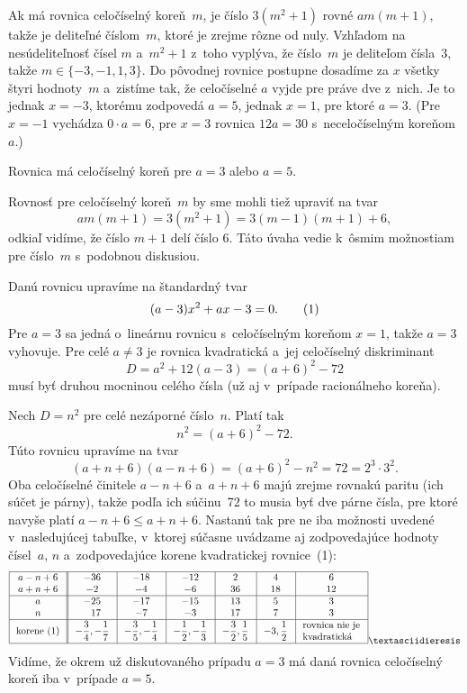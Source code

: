 {%
Ak má rovnica celočíselný koreň~$m$, je číslo $3(m^2+1)$
rovné $am(m+1)$, takže je deliteľné číslom~$m$, ktoré je zrejme
rôzne od nuly. Vzhľadom na nesúdeliteľnosť
čísel $m$ a~$m^2+1$ z~toho vyplýva, že číslo~$m$ je deliteľom čísla~$3$,
takže $m\in\{-3, -1, 1, 3\}$. Do pôvodnej rovnice postupne dosadíme
za $x$ všetky štyri hodnoty~$m$ a~zistíme tak, že celočíselné $a$ vyjde
pre práve dve z~nich. Je to jednak $x={-3}$, ktorému zodpovedá
$a=5$, jednak $x=1$, pre ktoré $a=3$. (Pre $x={-1}$ vychádza $0\cdot a=6$,
pre $x=3$ rovnica $12a=30$ s~neceločíselným koreňom~$a$.)

\odpoved
Rovnica má celočíselný koreň pre $a=3$ alebo $a=5$.

\poznamka
Rovnosť pre celočíselný koreň~$m$ by sme mohli tiež upraviť na tvar
$$am(m+1)=3(m^2+1)=3(m-1)(m+1)+6,$$
odkiaľ vidíme, že číslo $m+1$ delí číslo 6. Táto úvaha vedie k~ôsmim
možnostiam pre číslo~$m$ s~podobnou diskusiou.


\ineriesenie
Danú rovnicu upravíme na štandardný tvar
$$
(a-3)x^2+ax-3=0. \tag1
$$
Pre $a=3$ sa jedná o~lineárnu rovnicu s~celočíselným koreňom $x=1$,
takže $a=3$ vyhovuje. Pre celé $a\ne3$ je rovnica kvadratická a~jej
celočíselný diskriminant
$$
D=a^2+12(a-3)=(a+6)^2-72
$$
musí byť druhou mocninou celého čísla (už aj v~prípade racionálneho koreňa).

Nech $D=n^2$ pre celé nezáporné číslo~$n$. Platí tak
$$
n^2=(a+6)^2-72.
$$
Túto rovnicu upravíme na tvar
$$
(a+n+6)(a-n+6)= (a+6)^2-n^2=72=2^3\cdot3^2.
$$
Oba celočíselné činitele $a-n+6$ a~$a+n+6$ majú zrejme rovnakú paritu
(ich súčet je párny), takže podľa ich súčinu~72 to musia byť dve
párne čísla, pre ktoré navyše platí $a-n+6\le a+n+6$. Nastanú tak pre ne iba možnosti
uvedené v~nasledujúcej tabuľke, v~ktorej súčasne uvádzame aj zodpovedajúce
hodnoty čísel~$a$, $n$ a~zodpovedajúce korene kvadratickej rovnice~(1):
$$
\setbox1=\vbox{\hbox{\strut rovnica nie je}
\hbox{\strut kvadratická}}
\vbox{\offinterlineskip \def\mez{\hskip 7pt plus 1 fil}
\def\gez{\hskip 8pt plus 1 fil} \def\m{\hphantom{-}}
\halign{\vrule\strut\mez$#$\mez\vrule\hskip1pt\vrule&&\mez$#$\gez\vrule\cr
\noalign{\hrule}
a-n+6&-36&-18&-12&2 &4 & 6\cr
a+n+6&-2 &-4&-6 &36&18&12\cr
\noalign{\hrule}
a &-25&-17&-15&13&5 &3\cr
n & \m17& -7&-3 &17&7 &3\cr
\noalign{\hrule}
\hbox{korene (1)}\vrule height11pt depth 5pt width 0pt
& -\dfrac34,-\dfrac17 &-\dfrac35,-\dfrac14
& -\dfrac12,-\dfrac13 &-\dfrac32,\dfrac15
& -3,\dfrac12&\vcenter{\box1}\cr
\noalign{\hrule}
}}¨
$$
Vidíme, že okrem už diskutovaného prípadu $a=3$ má daná rovnica
celočíselný koreň iba v~prípade $a=5$.


}
